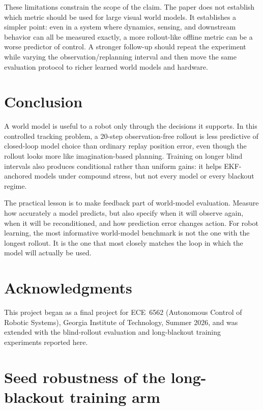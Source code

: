 \documentclass{article}
\begin{document}
These limitations constrain the scope of the claim. The paper does not establish which metric should be used for large visual world models. It establishes a simpler point: even in a system where dynamics, sensing, and downstream behavior can all be measured exactly, a more rollout-like offline metric can be a worse predictor of control. A stronger follow-up should repeat the experiment while varying the observation/replanning interval and then move the same evaluation protocol to richer learned world models and hardware.

\section{Conclusion}

A world model is useful to a robot only through the decisions it supports. In this controlled tracking problem, a 20-step observation-free rollout is less predictive of closed-loop model choice than ordinary replay position error, even though the rollout looks more like imagination-based planning. Training on longer blind intervals also produces conditional rather than uniform gains: it helps EKF-anchored models under compound stress, but not every model or every blackout regime.

The practical lesson is to make feedback part of world-model evaluation. Measure how accurately a model predicts, but also specify when it will observe again, when it will be reconditioned, and how prediction error changes action. For robot learning, the most informative world-model benchmark is not the one with the longest rollout. It is the one that most closely matches the loop in which the model will actually be used.

\section*{Acknowledgments}
This project began as a final project for ECE~6562 (Autonomous Control of Robotic Systems), Georgia Institute of Technology, Summer 2026, and was extended with the blind-rollout evaluation and long-blackout training experiments reported here.




\appendix
\section{Seed robustness of the long-blackout training arm}
\label{app:seeds}
\end{document}
